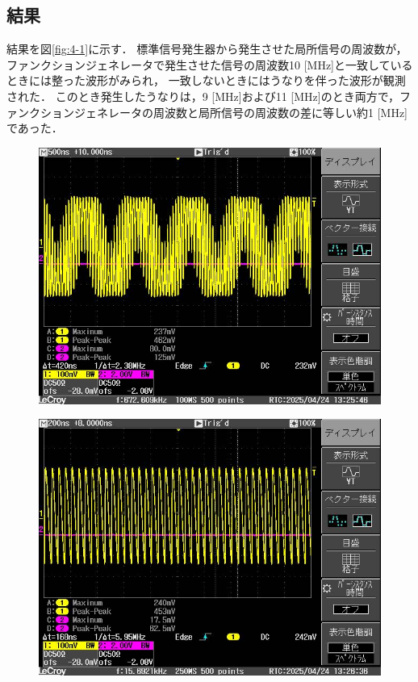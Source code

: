 \documentclass[uplatex,dvipdfmx,a4j,12pt]{jsarticle}
\begin{document}
\subsection{結果}
結果を図\ref{fig:4-1}に示す．
標準信号発生器から発生させた局所信号の周波数が，ファンクションジェネレータで発生させた信号の周波数10 [MHz]と一致しているときには整った波形がみられ，
一致しないときにはうなりを伴った波形が観測された．
このとき発生したうなりは，9 [MHz]および11 [MHz]のとき両方で，ファンクションジェネレータの周波数と局所信号の周波数の差に等しい約1 [MHz]であった．
\begin{figure}[H]
    \centering
    \begin{minipage}
        [b]{0.45\linewidth}
        \centering
        \includegraphics[width=\linewidth]{img/4_1_8MHz.jpg}
        \label{fig:4-1-a}
    \end{minipage}
    \begin{minipage}
        [b]{0.45\linewidth}
        \centering
        \includegraphics[width=\linewidth]{img/4_1_10MHz.jpg}

\end{minipage}
\end{figure}
\end{document}
